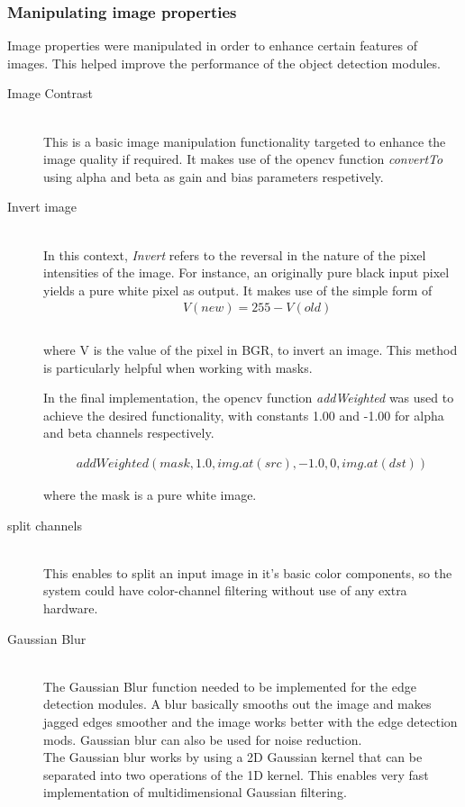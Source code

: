 \subsubsection{Manipulating image properties} 
Image properties were manipulated in order to enhance certain features of images. This helped improve the performance of the object detection modules.
\begin{description}
\item[Image Contrast]\hfill \\
This is a basic image manipulation functionality targeted to enhance the image quality if required.
It makes use of the opencv function \emph{convertTo} using alpha and beta as gain and bias parameters respetively.

\item[Invert image]\hfill \\
In this context, \emph{Invert} refers to the reversal in the nature of the pixel intensities of the image.
For instance, an originally pure black input pixel yields a pure white pixel as output.
It makes use of the simple form of  
\begin{align*} &V(new) = 255 - V(old) \\ 
\end{align*} 
\\where V is the value of the pixel in BGR, to invert an image. 
This method is particularly helpful when working with masks.

In the final implementation, the opencv function \emph{addWeighted} was used to achieve the desired functionality, with constants 1.00 and -1.00 for alpha and beta channels respectively.

\begin{align*}
addWeighted(mask, 1.0, img.at(src), -1.0, 0, img.at(dst))
\end{align*}

where the mask is a pure white image.

\item[split channels]\hfill \\
This enables to split an input image in it's basic color components, so the system could have color-channel filtering without use of any extra hardware.

\item[Gaussian Blur]\hfill \\
The Gaussian Blur function \cite{web:gaussianBlur}  needed to be implemented for the edge detection modules. A blur basically smooths out the image and makes jagged edges smoother and the image works better with the edge detection mods. Gaussian blur can also be used for noise reduction.
\\The Gaussian blur works by using a 2D Gaussian kernel that can be separated into two operations of the 1D kernel. This enables very fast implementation of multidimensional Gaussian filtering.  


\end{description}

